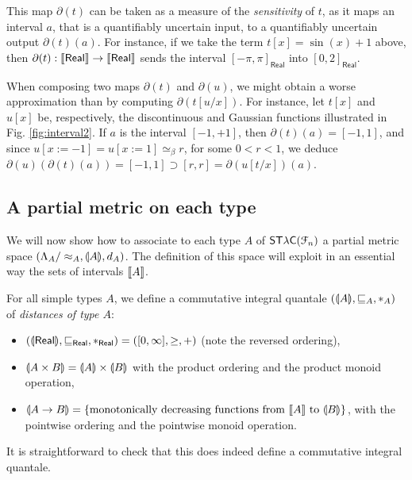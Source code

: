 This map $\partial(t)$ can be taken as a measure of the \emph{sensitivity} of $t$, as it maps an interval $a$, that is a quantifiably uncertain input, to a quantifiably uncertain output $\partial(t)(a)$. 
For instance, if we take the term $t[x]= \sin(x)+1$ above, then $\partial(t): \llbracket \mathsf{Real} \rrbracket\to \llbracket \mathsf{Real} \rrbracket$ sends the interval $[-\pi,\pi]_{\mathsf{Real}}$ into $[0,2]_{\mathsf{Real}}$.

\begin{remark}
When composing two maps $\partial(t)$ and $\partial(u)$, we might obtain a worse approximation than by computing $\partial(t[u/x])$.
For instance, let $t[x]$ and 
$u[x]$ be, respectively, the discontinuous and Gaussian functions illustrated in Fig. \ref{fig:interval2}.  
If $a$ is the interval $[-1,+1]$, then $\partial(t)(a)=[-1,1]$, and since $u[x:=-1]=u[x:=1]\simeq_{\beta} r$, for some $0<r<1$, we deduce $\partial(u)(\partial(t)(a))=[-1,1] \supset [r,r  ]= \partial (u[t/x])(a)$.

\end{remark}










\subsection{A partial metric on each type}

We will now show how to associate to each type $A$ of $\mathsf{ST\lambda C}(\mathcal F_{n})$ a partial metric space $(\Lambda_{A}/\approx_{A}, \llparenthesis A \rrparenthesis, d_{A})$. The definition of this space will exploit in an essential way the sets of intervals $\llbracket A \rrbracket$.


For all simple types $A$, we define a commutative integral quantale $(\llparenthesis A \rrparenthesis, \sqsubseteq_A, \mathbin{\ast}_A)$ of \emph{distances of type $A$}:
\begin{itemize}
\item $(\llparenthesis \mathsf{Real} \rrparenthesis, \sqsubseteq_\mathsf{Real}, \mathbin{\ast}_\mathsf{Real}) = ([0,\infty], \geq, +)$ (note the reversed ordering),
\item $\llparenthesis A \times B \rrparenthesis = \llparenthesis A \rrparenthesis \times \llparenthesis B \rrparenthesis$ with the product ordering and the product monoid operation,
\item $\llparenthesis A \to B \rrparenthesis = \{ \text{monotonically decreasing functions from } \llbracket A \rrbracket \text{ to } \llparenthesis B \rrparenthesis \}$, with the pointwise ordering and the pointwise monoid operation.
\end{itemize}
It is straightforward to check that this does indeed define a commutative integral quantale.

